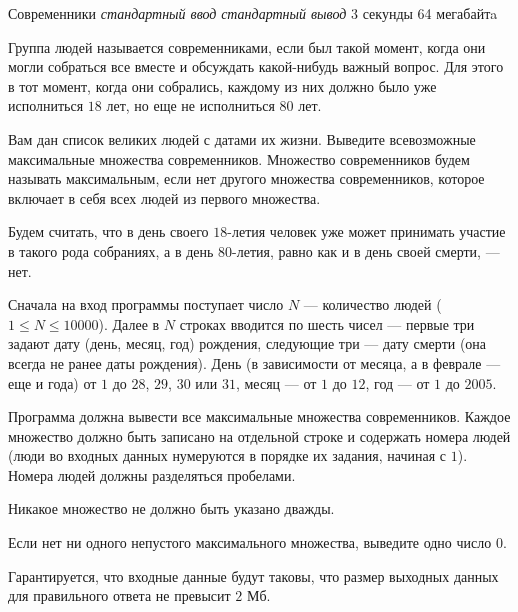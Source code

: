 \begin{problem}%
{Современники}%
{\textsl{стандартный ввод}}%
{\textsl{стандартный вывод}}%
{3 секунды}%
{64 мегабайтa}{}

Группа людей называется современниками, если был такой момент, когда они могли собраться все вместе и обсуждать какой-нибудь важный вопрос. Для этого в тот момент, когда они собрались, каждому из них должно было уже исполниться $18$ лет, но еще не исполниться $80$ лет.

Вам дан список великих людей с датами их жизни. Выведите всевозможные максимальные множества современников. Множество современников будем называть максимальным, если нет другого множества современников, которое включает в себя всех людей из первого множества.

Будем считать, что в день своего $18$-летия человек уже может принимать участие в такого рода собраниях, а в день $80$-летия, равно как и в день своей смерти, — нет.

\InputFile

Сначала на вход программы поступает число $N$ — количество людей ($1 \le N \le 10000$). Далее в $N$ строках  вводится по шесть чисел — первые три задают дату (день, месяц, год) рождения, следующие три — дату смерти (она всегда не ранее даты рождения). День (в зависимости от месяца, а в феврале — еще и года) от $1$ до $28$, $29$, $30$ или $31$, месяц — от $1$ до $12$, год — от $1$ до $2005$.
\OutputFile

Программа должна вывести все максимальные множества современников. Каждое множество должно быть записано на отдельной строке и содержать номера людей (люди во входных данных нумеруются в порядке их задания, начиная с $1$). Номера людей должны разделяться пробелами.

Никакое множество не должно быть указано дважды.

Если нет ни одного непустого максимального множества, выведите  одно число $0$.

Гарантируется, что входные данные будут таковы, что размер  выходных данных  для правильного ответа не превысит $2$ Мб.

\Examples

\begin{example}
%
%
%
\end{example}
\end{problem}
